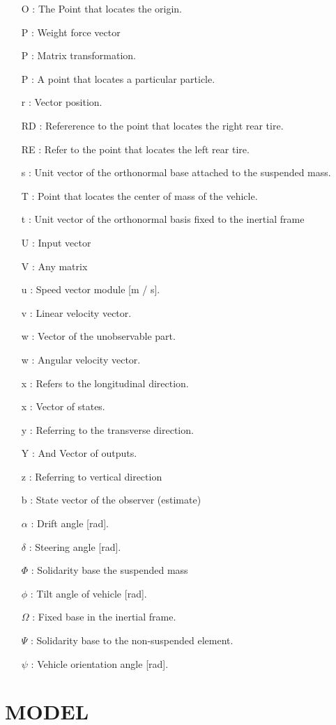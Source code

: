 \documentclass[sublist,a4paper,twoside,11pt]{article}
\begin{document}
\begin{itemize}
\item [O]: The Point that locates the origin.
\item [P]: Weight force vector
\item [P]: Matrix transformation.
\item [P]: A point that locates a particular particle.
\item [r]: Vector position.
\item [RD]: Refererence to the point that locates the right rear tire.
\item [RE]: Refer to the point that locates the left rear tire.
\item [s]: Unit vector of the orthonormal base attached to the suspended mass.
\item [T]: Point that locates the center of mass of the vehicle.
\item [t]: Unit vector of the orthonormal basis fixed to the inertial frame
\item [U]: Input vector
\item [V]: Any matrix
\item [u]: Speed vector module [m / s].
\item [v]: Linear velocity vector.
\item [w]: Vector of the unobservable part.
\item [w]: Angular velocity vector.
\item [x]: Refers to the longitudinal direction.
\item [x]: Vector of states.
\item [y]: Referring to the transverse direction.
\item [Y]: And Vector of outputs.
\item [z]: Referring to vertical direction
\item [b]: State vector of the observer (estimate)
\item [$\alpha$]: Drift angle [rad].
\item [$\delta$]: Steering angle [rad].
\item [$\Phi$]: Solidarity base the suspended mass
\item [$\phi$]: Tilt angle of vehicle [rad].
\item [$\Omega$]: Fixed base in the inertial frame.
\item [$\Psi$]: Solidarity base to the non-suspended element.
\item [$\psi$]: Vehicle orientation angle [rad].
\end{itemize}


\section{MODEL}
\end{document}
